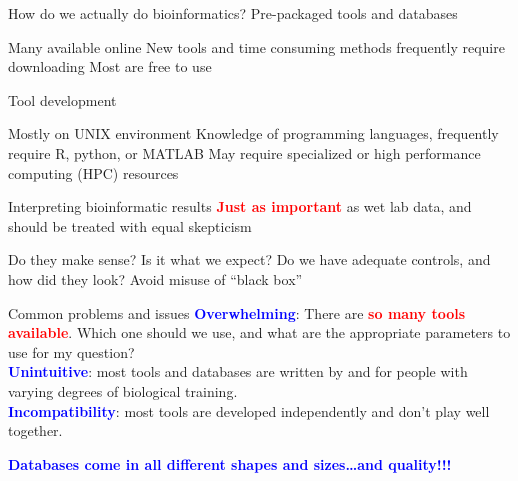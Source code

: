 \documentclass{beamer}
\renewcommand{\c}[1]{\begin{center}#1\end{center}}
\newcommand{\blu}[1]{\textcolor{blue}{\textbf{#1}}}
\newcommand{\red}[1]{\textcolor{red}{\textbf{#1}}}
\begin{document}
\begin{frame}{How do we actually do bioinformatics?}
Pre-packaged tools and databases
\begin{outline}
    \1[] Many available online
    \1[] New tools and time consuming methods frequently require downloading
    \1[] Most are free to use
\end{outline}

Tool development
\begin{outline}
    \1[] Mostly on UNIX environment
    \1[] Knowledge of programming languages, frequently require R, python, or MATLAB
    \1[] May require specialized or high performance computing (HPC) resources
\end{outline}

\end{frame}

\begin{frame}{Interpreting bioinformatic results}
\red{Just as important} as wet lab data, and should be treated with equal skepticism
\begin{outline}
    \1[] Do they make sense?
    \1[] Is it what we expect?
    \1[] Do we have adequate controls, and how did they look?
    \1[] Avoid misuse of “black box”
\end{outline}
\end{frame}

\begin{frame}{Common problems and issues}
    \blu{Overwhelming}: There are \red{so many tools available}. Which one should we use, and what are the appropriate parameters to use for my question?\\
    \bigskip
    \blu{Unintuitive}: most tools and databases are written by and for people with varying degrees of biological training.\\
    \bigskip
    \blu{Incompatibility}: most tools are developed independently and don’t play well together.
\end{frame}

\begin{frame}{}
\c{
    \huge \blu{Databases come in all different shapes and sizes\ldots and quality!!!\\
    }
}
\end{frame}
\end{document}
